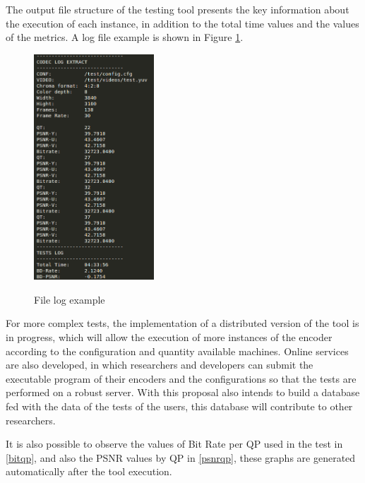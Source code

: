 \documentclass{acm_proc_article-sp}
\begin{document}
The output file structure of the testing tool presents the key information about the execution of each instance, in addition to the total time values and the values of the metrics. A log file example is shown in Figure \ref{fig:log}.

\FloatBarrier

\begin{figure}[!ht]
	\centering
	\caption{File log example}
	\includegraphics[width=0.4\textwidth]{figures/log.png}
	\label{fig:log}
\end{figure}

\FloatBarrier

For more complex tests, the implementation of a distributed version of the tool is in progress, which will allow the execution of more instances of the encoder according to the configuration and quantity available machines. Online services are also developed, in which researchers and developers can submit the executable program of their encoders and the configurations so that the tests are performed on a robust server. With this proposal also intends to build a database fed with the data of the tests of the users, this database will contribute to other researchers.

It is also possible to observe the values of Bit Rate per QP used in the test in \ref{bitqp}, and also the PSNR values by QP in \ref{psnrqp}, these graphs are generated automatically after the tool execution.
\end{document}
